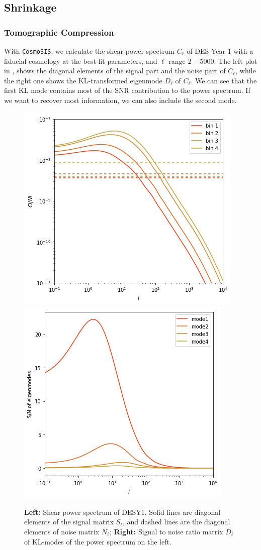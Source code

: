 \documentclass[twocolumn]{\docclass}
\begin{document}
	
	\subsection{Shrinkage}
	
	\subsubsection{Tomographic Compression}
	
	With  {\tt CosmoSIS}, we calculate the shear power spectrum $C_{\ell}$ of DES Year 1 with a fiducial cosmology at the best-fit parameters, and $\ell$-range $2-5000$. The left plot in , shows the diagonal elements of the signal part and the noise part of $C_{\ell}$, while the right one shows the KL-transformed eigenmode $D_{\ell}$ of $C_{\ell}$. We can see that the first KL mode contains most of the SNR contribution to the power spectrum. If we want to recover most information, we can also include the second mode.
	
	\begin{figure}
		\includegraphics[width=0.48\columnwidth]{Cl_pst.png}
		\includegraphics[width=0.48\columnwidth]{Dl_pst.png}
		\caption{\textbf{Left:} Shear power spectrum of DESY1. Solid lines are diagonal elements of the signal matrix $S_{\ell}$, and dashed lines are the diagonal elements of noise matrix $N_{\ell}$; \textbf{Right:} Signal to noise ratio matrix $D_\ell$ of KL-modes of the power spectrum on the left. \label{fig:ClDl}}
	\end{figure}
	
\end{document}

